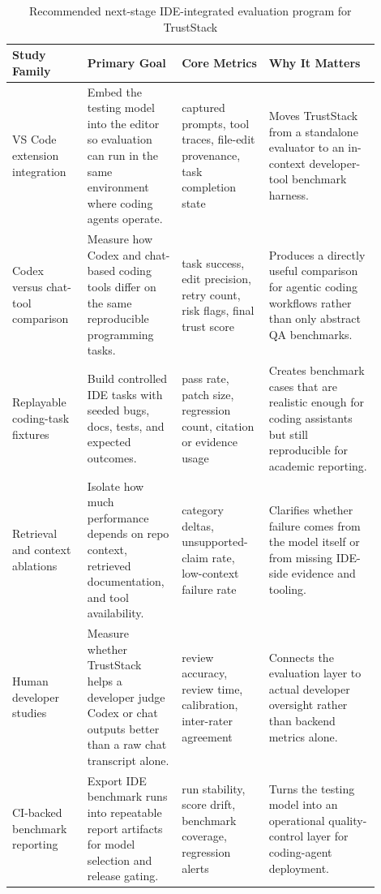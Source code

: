 \documentclass[conference]{IEEEtran}
\begin{document}
\begin{table}[t]
  \caption{Recommended next-stage IDE-integrated evaluation program for TrustStack}
  \label{tab:expanded-eval-agenda}
  \centering
  \begin{tabular}{p{0.19\linewidth}p{0.21\linewidth}p{0.22\linewidth}p{0.28\linewidth}}
    \toprule
    \rowcolor{TrustStackBlue!12}
    \textcolor{TrustStackBlue}{Study Family} & \textcolor{TrustStackBlue}{Primary Goal} & \textcolor{TrustStackBlue}{Core Metrics} & \textcolor{TrustStackBlue}{Why It Matters} \\
    \midrule
    VS Code extension integration & Embed the testing model into the editor so evaluation can run in the same environment where coding agents operate. & captured prompts, tool traces, file-edit provenance, task completion state & Moves TrustStack from a standalone evaluator to an in-context developer-tool benchmark harness. \\
    Codex versus chat-tool comparison & Measure how Codex and chat-based coding tools differ on the same reproducible programming tasks. & task success, edit precision, retry count, risk flags, final trust score & Produces a directly useful comparison for agentic coding workflows rather than only abstract QA benchmarks. \\
    Replayable coding-task fixtures & Build controlled IDE tasks with seeded bugs, docs, tests, and expected outcomes. & pass rate, patch size, regression count, citation or evidence usage & Creates benchmark cases that are realistic enough for coding assistants but still reproducible for academic reporting. \\
    Retrieval and context ablations & Isolate how much performance depends on repo context, retrieved documentation, and tool availability. & category deltas, unsupported-claim rate, low-context failure rate & Clarifies whether failure comes from the model itself or from missing IDE-side evidence and tooling. \\
    Human developer studies & Measure whether TrustStack helps a developer judge Codex or chat outputs better than a raw chat transcript alone. & review accuracy, review time, calibration, inter-rater agreement & Connects the evaluation layer to actual developer oversight rather than backend metrics alone. \\
    CI-backed benchmark reporting & Export IDE benchmark runs into repeatable report artifacts for model selection and release gating. & run stability, score drift, benchmark coverage, regression alerts & Turns the testing model into an operational quality-control layer for coding-agent deployment. \\
    \bottomrule
  \end{tabular}
\end{table}
\end{document}
